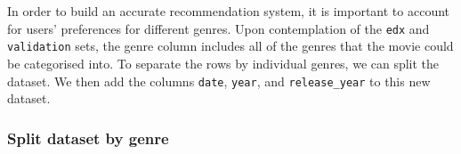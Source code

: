\documentclass[]{article}
\newenvironment{Shaded}{\begin{snugshade}}{\end{snugshade}}
\newcommand{\CharTok}[1]{\textcolor[rgb]{0.31,0.60,0.02}{#1}}
\newcommand{\DataTypeTok}[1]{\textcolor[rgb]{0.13,0.29,0.53}{#1}}
\newcommand{\DecValTok}[1]{\textcolor[rgb]{0.00,0.00,0.81}{#1}}
\newcommand{\KeywordTok}[1]{\textcolor[rgb]{0.13,0.29,0.53}{\textbf{#1}}}
\newcommand{\NormalTok}[1]{#1}
\newcommand{\OperatorTok}[1]{\textcolor[rgb]{0.81,0.36,0.00}{\textbf{#1}}}
\newcommand{\StringTok}[1]{\textcolor[rgb]{0.31,0.60,0.02}{#1}}
\begin{document}
\begin{Shaded}
\end{Shaded}

In order to build an accurate recommendation system, it is important to
account for users' preferences for different genres. Upon contemplation
of the \texttt{edx} and \texttt{validation} sets, the genre column
includes all of the genres that the movie could be categorised into. To
separate the rows by individual genres, we can split the dataset. We
then add the columns \texttt{date}, \texttt{year}, and
\texttt{release\_year} to this new dataset.

\hypertarget{split-dataset-by-genre}{%
\subsubsection{Split dataset by genre}\label{split-dataset-by-genre}}

\begin{Shaded}
\end{Shaded}
\end{document}
